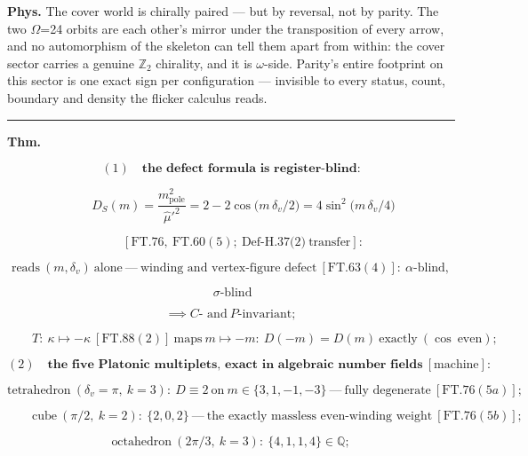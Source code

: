\begin{theorem}
\textbf{Phys.} The cover world is chirally paired — but by reversal, not by parity. The two $\Omega$=24 orbits are each other's mirror under the transposition of every arrow, and no automorphism of the skeleton can tell them apart from within: the cover sector carries a genuine $\mathbb{Z}$$_2$ chirality, and it is $\omega$-side. Parity's entire footprint on this sector is one exact sign per configuration — invisible to every status, count, boundary and density the flicker calculus reads.

\vspace{2pt}\noindent\rule{\textwidth}{0.4pt}\vspace{2pt}

\end{theorem}

\begin{theorem}\label{tag:FT-138}
\textbf{Thm.}

\[
(1)\quad\textbf{the defect formula is register-blind:}
\]

\[
\qquad D_S(m)=\frac{m^2_{\mathrm{pole}}}{\hat\mu'^2}=2-2\cos\bigl(m\,\delta_v/2\bigr)=4\sin^2\bigl(m\,\delta_v/4\bigr)
\]

\[
\qquad [\mathrm{FT.76},\ \mathrm{FT.60}(5);\ \text{Def-H.37(2)}\ \text{transfer}]:
\]

\[
\text{reads}\ (m,\delta_v)\ \text{alone}\ —\ \text{winding and vertex-figure defect}\ [\mathrm{FT.63}(4)]:\ \alpha\text{-blind},
\]

\[
\ \sigma\text{-blind}
\]

\[
\implies C\text{- and}\ P\text{-invariant};
\]

\[
\qquad T:\ \kappa\mapsto-\kappa\ [\mathrm{FT.88}(2)]\ \text{maps}\ m\mapsto-m:\ D(-m)=D(m)\ \text{exactly}\ (\cos\ \text{even});
\]

\[
(2)\quad\textbf{the five Platonic multiplets, exact in algebraic number fields}\ [\text{machine}]:
\]

\[
\text{tetrahedron}\ (\delta_v=\pi,\ k=3):\ D\equiv2\ \text{on}\ m\in\{3,1,-1,-3\}\ —\ \text{fully degenerate}\ [\mathrm{FT.76}(5a)];
\]

\[
\qquad \text{cube}\ (\pi/2,\ k=2):\ \{2,0,2\}\ —\ \text{the exactly massless even-winding weight}\ [\mathrm{FT.76}(5b)];
\]

\[
\text{octahedron}\ (2\pi/3,\ k=3):\ \{4,1,1,4\}\in\mathbb Q;
\]


\end{theorem}
